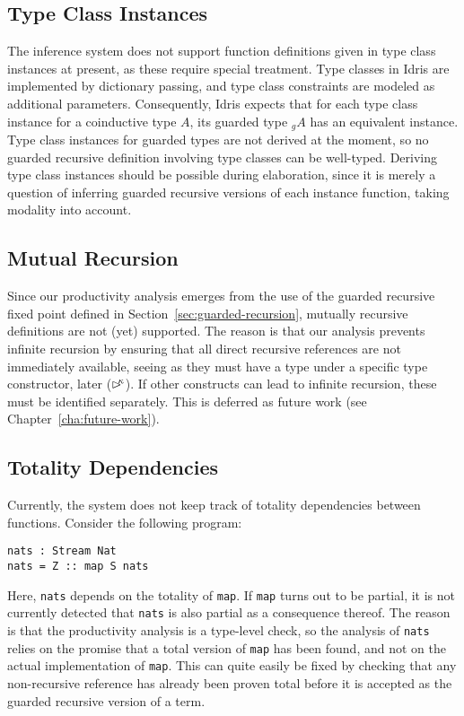 \subsection{Type Class Instances}
\label{sec:type-class-instances}
The inference system does not support function definitions given in type class
instances at present, as these require special treatment. Type classes in Idris
are implemented by dictionary passing, and type class constraints are modeled as
additional parameters. Consequently, Idris expects that for each type class
instance for a coinductive type $A$, its guarded type $_gA$ has an equivalent
instance. Type class instances for guarded types are not derived at the moment,
so no guarded recursive definition involving type classes can be
well-typed. Deriving type class instances should be possible during elaboration,
since it is merely a question of inferring guarded recursive versions of each
instance function, taking modality into account.


\subsection{Mutual Recursion}
Since our productivity analysis emerges from the use of the guarded recursive
fixed point defined in Section~\ref{sec:guarded-recursion}, mutually recursive
definitions are not (yet) supported. The reason is that our analysis prevents
infinite recursion by ensuring that all direct recursive references are not
immediately available, seeing as they must have a type under a specific type
constructor, later ($\rhd^{\!\!\kappa}$). If other constructs can lead to infinite
recursion, these must be identified separately. This is deferred as future work
(see Chapter~\ref{cha:future-work}).

\subsection{Totality Dependencies}
Currently, the system does not keep track of totality dependencies between
functions. Consider the following program:
\begin{lstlisting}[mathescape]
nats : Stream Nat
nats = Z :: map S nats
\end{lstlisting}
Here, \texttt{nats} depends on the totality of \texttt{map}. If \texttt{map}
turns out to be partial, it is not currently detected that \texttt{nats} is also
partial as a consequence thereof. The reason is that the productivity analysis
is a type-level check, so the analysis of \texttt{nats} relies on the promise that
a total version of \texttt{map} has been found, and not on the actual
implementation of \texttt{map}. This can quite easily be fixed by checking that
any non-recursive reference has already been proven total before it is accepted
as the guarded recursive version of a term.

